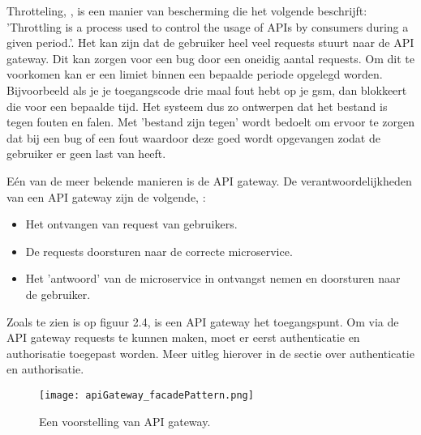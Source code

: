 Throtteling, \textcite{Cavalcanti2018}, is een manier van bescherming die het volgende beschrijft: 'Throttling is a process used to control the usage of APIs by consumers during a given period.'. Het kan zijn dat de gebruiker heel veel requests stuurt naar de API gateway. Dit kan zorgen voor een bug door een oneidig aantal requests. Om dit te voorkomen kan er een limiet binnen een bepaalde periode opgelegd worden. Bijvoorbeeld als je je toegangscode drie maal fout hebt op je gsm, dan blokkeert die voor een bepaalde tijd. Het systeem dus zo ontwerpen dat het bestand is tegen fouten en falen. Met 'bestand zijn tegen' wordt bedoelt om ervoor te zorgen dat bij een bug of een fout waardoor deze goed wordt opgevangen zodat de gebruiker er geen last van heeft. 

Eén van de meer bekende manieren is de API gateway. De verantwoordelijkheden van een API gateway zijn de volgende, \textcite{Siraj2017}:
\begin{itemize}
	\item Het ontvangen van request van gebruikers.
	\item De requests doorsturen naar de correcte microservice.
	\item Het 'antwoord' van de microservice in ontvangst nemen en doorsturen naar de gebruiker.
\end{itemize}
Zoals te zien is op figuur 2.4, is een API gateway het toegangspunt. Om via de API gateway requests te kunnen maken, moet er eerst authenticatie en authorisatie toegepast worden. Meer uitleg hierover in de sectie over authenticatie en authorisatie.
\begin{figure}[h!]
	\texttt{[image: apiGateway\_facadePattern.png]}
	\centering
	\caption{Een voorstelling van API gateway. \textcite{Siraj2017}}
\end{figure}


